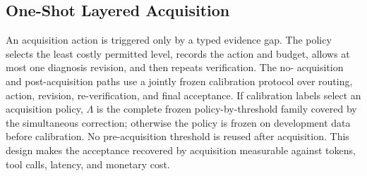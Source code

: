 \subsection{One-Shot Layered Acquisition}

An acquisition action is triggered only by a typed evidence gap. The policy
selects the least costly permitted level, records the action and budget, allows
at most one diagnosis revision, and then repeats verification. The no-
acquisition and post-acquisition paths use a jointly frozen calibration
protocol over routing, action, revision, re-verification, and final acceptance.
If calibration labels select an acquisition policy, $\Lambda$ is the complete
frozen policy-by-threshold family covered by the simultaneous correction;
otherwise the policy is frozen on development data before calibration. No
pre-acquisition threshold is reused after acquisition. This design makes the
acceptance recovered by acquisition measurable against tokens, tool calls,
latency, and monetary cost.
